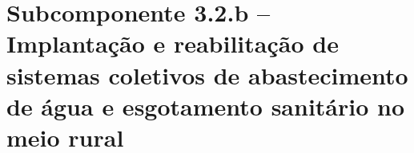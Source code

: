 \chapter[Subcomponente 3.2.b -- Abastecimento e esgotamento no meio rural]%
{Subcomponente 3.2.b -- Implantação e reabilitação de sistemas coletivos de
abastecimento de água e esgotamento sanitário no meio rural}
\label{cap:3-2-b}














